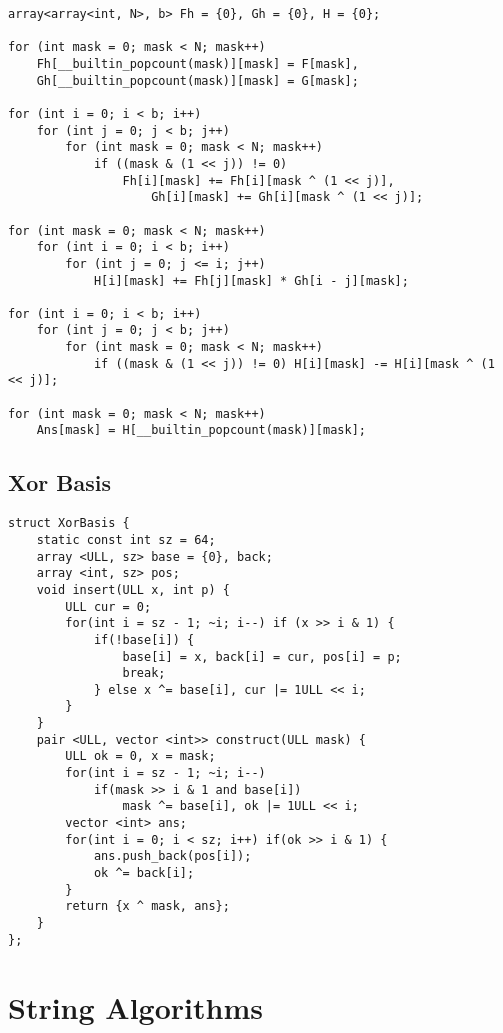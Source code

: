 \documentclass[10pt,a4paper,onesided]{article}
\begin{document}
\begin{multicols*}{3}
\begin{lstlisting}
array<array<int, N>, b> Fh = {0}, Gh = {0}, H = {0};

for (int mask = 0; mask < N; mask++)
    Fh[__builtin_popcount(mask)][mask] = F[mask],
    Gh[__builtin_popcount(mask)][mask] = G[mask];

for (int i = 0; i < b; i++)
    for (int j = 0; j < b; j++)
        for (int mask = 0; mask < N; mask++)
            if ((mask & (1 << j)) != 0)
                Fh[i][mask] += Fh[i][mask ^ (1 << j)],
                    Gh[i][mask] += Gh[i][mask ^ (1 << j)];

for (int mask = 0; mask < N; mask++)
    for (int i = 0; i < b; i++)
        for (int j = 0; j <= i; j++)
            H[i][mask] += Fh[j][mask] * Gh[i - j][mask];

for (int i = 0; i < b; i++)
    for (int j = 0; j < b; j++)
        for (int mask = 0; mask < N; mask++)
            if ((mask & (1 << j)) != 0) H[i][mask] -= H[i][mask ^ (1 << j)];

for (int mask = 0; mask < N; mask++)
    Ans[mask] = H[__builtin_popcount(mask)][mask];
\end{lstlisting}
\subsection{Xor Basis}
\begin{lstlisting}
struct XorBasis {
    static const int sz = 64;
    array <ULL, sz> base = {0}, back;
    array <int, sz> pos;
    void insert(ULL x, int p) {
        ULL cur = 0;
        for(int i = sz - 1; ~i; i--) if (x >> i & 1) {
            if(!base[i]) {
                base[i] = x, back[i] = cur, pos[i] = p;
                break;
            } else x ^= base[i], cur |= 1ULL << i;
        }
    }
    pair <ULL, vector <int>> construct(ULL mask) {
        ULL ok = 0, x = mask;
        for(int i = sz - 1; ~i; i--)  
            if(mask >> i & 1 and base[i])
                mask ^= base[i], ok |= 1ULL << i;
        vector <int> ans;
        for(int i = 0; i < sz; i++) if(ok >> i & 1) {
            ans.push_back(pos[i]);
            ok ^= back[i];
        }
        return {x ^ mask, ans};
    } 
};\end{lstlisting}
\section{String Algorithms}

\end{multicols*}
\end{document}
